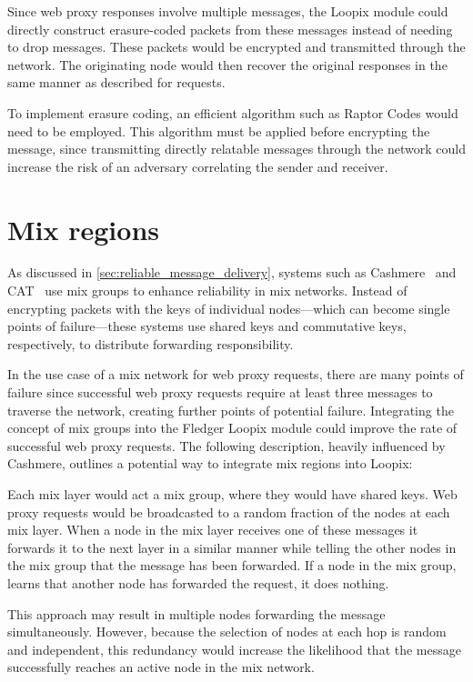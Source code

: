 \documentclass[a4paper,11pt,oneside]{report}
\begin{document}
Since web proxy responses involve multiple messages, the Loopix module could directly construct erasure-coded packets from these messages instead of needing to drop messages. These packets would be encrypted and transmitted through the network. The originating node would then recover the original responses in the same manner as described for requests.

To implement erasure coding, an efficient algorithm such as Raptor Codes \cite{raptor} would need to be employed. This algorithm must be applied before encrypting the message, since transmitting directly relatable messages through the network could increase the risk of an adversary correlating the sender and receiver.

\section{Mix regions}

As discussed in \autoref{sec:reliable_message_delivery}, systems such as Cashmere~\cite{cashmere} and CAT~\cite{CAT} use mix groups to enhance reliability in mix networks. Instead of encrypting packets with the keys of individual nodes—which can become single points of failure—these systems use shared keys and commutative keys, respectively, to distribute forwarding responsibility.

In the use case of a mix network for web proxy requests, there are many points of failure since successful web proxy requests require at least three messages to traverse the network, creating further points of potential failure. Integrating the concept of mix groups into the Fledger Loopix module could improve the rate of successful web proxy requests. The following description, heavily influenced by Cashmere, outlines a potential way to integrate mix regions into Loopix:

Each mix layer would act a mix group, where they would have shared keys. Web proxy requests would be broadcasted to a random fraction of the nodes at each mix layer. When a node in the mix layer receives one of these messages it forwards it to the next layer in a similar manner while telling the other nodes in the mix group that the message has been forwarded. If a node in the mix group, learns that another node has forwarded the request, it does nothing.

This approach may result in multiple nodes forwarding the message simultaneously. However, because the selection of nodes at each hop is random and independent, this redundancy would increase the likelihood that the message successfully reaches an active node in the mix network.
\end{document}
